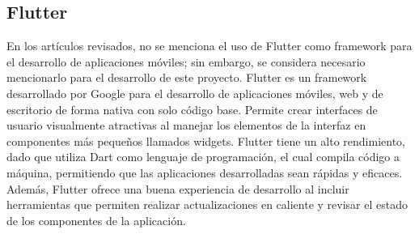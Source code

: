 \subsection{Flutter}
En los artículos revisados, no se menciona el uso de Flutter como framework para el desarrollo de aplicaciones móviles;
sin embargo, se considera necesario mencionarlo para el desarrollo de este proyecto. Flutter es un framework desarrollado
por Google para el desarrollo de aplicaciones móviles, web y de escritorio de forma nativa con solo código base. Permite
crear interfaces de usuario visualmente atractivas al manejar los elementos de la interfaz en componentes más pequeños
llamados widgets. Flutter tiene un alto rendimiento, dado que utiliza Dart como lenguaje de programación, el cual compila
código a máquina, permitiendo que las aplicaciones desarrolladas sean rápidas y eficaces. Además, Flutter ofrece una buena
experiencia de desarrollo al incluir herramientas que permiten realizar actualizaciones en caliente y revisar el estado de
los componentes de la aplicación.